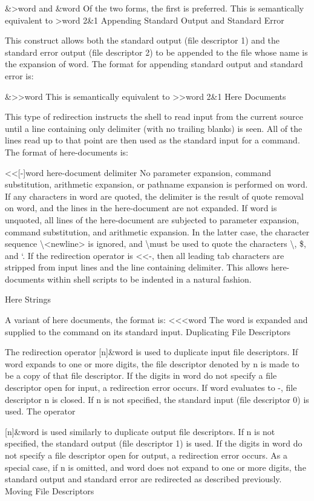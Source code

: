 \&>word
and
\&word
Of the two forms, the first is preferred. This is semantically equivalent to
>word 2\&1
Appending Standard Output and Standard Error

This construct allows both the standard output (file descriptor 1) and the standard error output (file descriptor 2) to be appended to the file whose name is the expansion of word.
The format for appending standard output and standard error is:

\&>>word
This is semantically equivalent to
>>word 2\&1
Here Documents

This type of redirection instructs the shell to read input from the current source until a line containing only delimiter (with no trailing blanks) is seen. All of the lines read up to that point are then used as the standard input for a command.
The format of here-documents is:

<<[-]word
        here-document
delimiter
No parameter expansion, command substitution, arithmetic expansion, or pathname expansion is performed on word. If any characters in word are quoted, the delimiter is the result of quote removal on word, and the lines in the here-document are not expanded. If word is unquoted, all lines of the here-document are subjected to parameter expansion, command substitution, and arithmetic expansion. In the latter case, the character sequence \textbackslash<newline> is ignored, and \textbackslash must be used to quote the characters \textbackslash, \$, and `.
If the redirection operator is <<-, then all leading tab characters are stripped from input lines and the line containing delimiter. This allows here-documents within shell scripts to be indented in a natural fashion.

Here Strings

A variant of here documents, the format is:
<<<word
The word is expanded and supplied to the command on its standard input.
Duplicating File Descriptors

The redirection operator
[n]\&word
is used to duplicate input file descriptors. If word expands to one or more digits, the file descriptor denoted by n is made to be a copy of that file descriptor. If the digits in word do not specify a file descriptor open for input, a redirection error occurs. If word evaluates to -, file descriptor n is closed. If n is not specified, the standard input (file descriptor 0) is used.
The operator

[n]\&word
is used similarly to duplicate output file descriptors. If n is not specified, the standard output (file descriptor 1) is used. If the digits in word do not specify a file descriptor open for output, a redirection error occurs. As a special case, if n is omitted, and word does not expand to one or more digits, the standard output and standard error are redirected as described previously.
Moving File Descriptors

